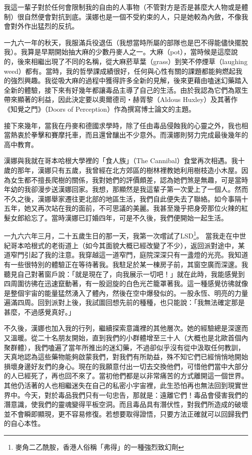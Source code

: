 我這一輩子對於任何會限制我的自由的人事物（不管對方是否是甚麼大人物或是體制）很自然便會對抗到底。漢娜也是一個不受約束的人，只是她較為內斂，不像我會對外作出猛烈的反抗。

一九六一年的秋天，我服滿兵役退伍（我想當時所屬的部隊也是巴不得能儘快擺脫我）。我算是早期開始抽大麻的少數丹麥人之一。大麻（pot），當時候是這麼說的，後來相繼出現了不同的名稱，從大麻菸草葉（grass）到笑不停煙草（laughing
weed）都有。當時，我的哲學課成績很好，任何與心性有關的課題都能夠燃起我的強烈興趣。我從吸大麻的過程中獲得許多全新的見解，後來更藉由嗑迷幻藥踏入全新的體驗，接下來有好幾年都讓毒品主導了自己的生活。由於我認為它們為眾生帶來顯著的利益，因此決定要以奧爾德司‧赫胥黎（Aldous
Huxley）及其著作《知覺之門》（Doors of
Perception）作為撰寫博士論文的主題。

接下來幾年，當我在丹麥和德國求學時，除了任由毒品侵蝕我的心靈之外，我也相當熱衷於拳擊和賽摩托車，而且還曾釀出不少意外。而漢娜則努力完成最後幾年的高中教育。

漢娜與我就在哥本哈根大學裡的「食人族」（The
Cannibal）食堂再次相遇。我十歲的那年，漢娜只有五歲，我曾經在北方郊區的樹林裡教她利用樹枝造小木屋。因為女生都不擅長爬樹的關係，我對她們的評價頗差，認為她們煞是無趣，可是當時年幼的我卻漫步送漢娜回家。我想，那顯然是我這輩子第一次愛上了一個人。然而不久之後，漢娜舉家遷往更北部的地區生活，我們自此便失去了聯絡。如今事隔十五年，她又再次站在我的面前，不可思議的美麗。我甚至幾乎把身旁那位火辣的紅髮女郎給忘了。當時漢娜已訂婚四年，可是不久後，我們便開始一起生活。

一九六六年三月，二十五歲生日的那一天，我第一次嚐試了LSD\footnote{麥角二乙酰胺，香港人俗稱「弗得」的一種強烈致幻劑}。
當我走在中世紀哥本哈根式的老街道上（如今其面貌大概已經改變了不少），返回派對途中，某道窄門引起了我的注意。我穿越這一道窄門，庭院深深只有一盞燈的光亮。我知道有一些很特別的體驗正在等待著我。我駐足於某一棟房子前，其窗空廣而深邃。我聽見自己對著窗戶說：「就是現在了，向我展示一切吧！」就在此時，我能感覺到四周圍彷彿在迅速竄動著，有一股迴旋的白色光芒籠罩著我。這一種感覺彷彿就像是整個宇宙的能量猛然湧入了體內，然後在空中爆發似的。一股永恆、明亮的力量遍滿四周。回到派對上後，我試圖回想先前的種種，也只能說：「我無法確定那是甚麼，不過感覺真好。」

不久後，漢娜也加入我的行列，繼續探索意識裡的其他層次。她的經驗總是深邃而又溫暖。從二十名朋友開始，直到我們的小群體增至三十人（大概也是北歐首個內聚群體），我們嗑遍了當年所推出的迷幻藥，不過卻似乎沒有從中汲取任何教訓，天真地認為這些藥物能夠啟蒙我們，對我們有所助益，殊不知它們已經悄悄地開始損壞身邊好友們的身心。現在的我願意付出一切去交換他們，可惜他們當中大部分的人已經死了，再也回不來了。當初他們都是以非常痛苦的方式離開這一個世界。其他仍活著的人也相繼迷失在自己的私密小宇宙裡，此生恐怕再也無法回到現實世界中。今天，對於毒品我們只有一句忠告，那就是：遠離它們！毒品會侵害我們的潛意識，使我們的靈魂變得平板空洞。而且毒品具有潛伏性，對我們所造成的破壞並不會瞬即顯現，更不容易修復。若想要取得證悟，只要方法正確就可以回歸我們的自心本性。


